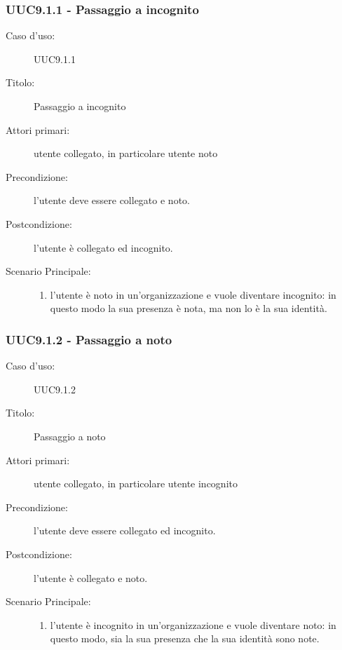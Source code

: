 \documentclass[../../../analisi-dei-requisiti.tex]{subfiles}
\begin{document}
\subsubsection{UUC9.1.1 - Passaggio a incognito}%
\label{subs:UUC9.1.1}
\begin{description}
  \item[Caso d’uso:] UUC9.1.1
  \item[Titolo:] Passaggio a incognito
  \item[Attori primari:] utente collegato, in particolare utente noto
  \item[Precondizione:] l'utente deve essere collegato e noto.
  \item[Postcondizione:] l'utente è collegato ed incognito.
  \item[Scenario Principale:]
        \begin{enumerate}
          \item l'utente è noto in un'organizzazione e vuole diventare incognito: in questo modo la sua presenza è nota, ma non lo è la sua identità.
        \end{enumerate}
\end{description}

\subsubsection{UUC9.1.2 - Passaggio a noto}%
\label{subs:UUC9.1.2}
\begin{description}
  \item[Caso d’uso:] UUC9.1.2
  \item[Titolo:] Passaggio a noto
  \item[Attori primari:] utente collegato, in particolare utente incognito
  \item[Precondizione:] l'utente deve essere collegato ed incognito.
  \item[Postcondizione:] l'utente è collegato e noto.
  \item[Scenario Principale:]
        \begin{enumerate}
          \item l'utente è incognito in un'organizzazione e vuole diventare noto: in questo modo, sia la sua presenza che la sua identità sono note.
        \end{enumerate}
\end{description}
\end{document}
